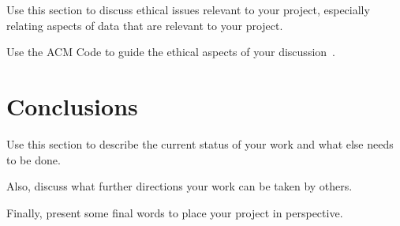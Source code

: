 \documentclass[sigconf, anonymous]{acmart}
\begin{document}
Use this section to discuss ethical issues relevant to your
project, especially relating aspects of data that are relevant to your
project.

Use the ACM Code to guide the ethical aspects of your
discussion~\cite{ACMCODE}.


\section{Conclusions}
\label{conclusions}

Use this section to describe the current status of your work
and what else needs to be done.

Also, discuss what further directions your work can be taken by
others.

Finally, present some final words to place your project in
perspective.

\balance
\end{document}
